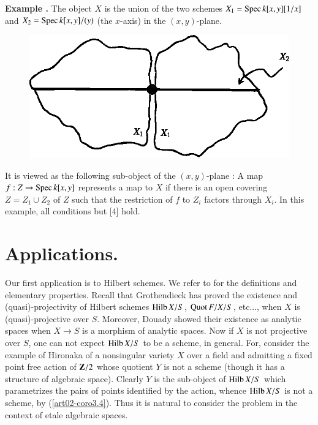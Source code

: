 \medskip
\noindent
{\bf Example .\label{art02-exam5.11}}
The object $X$ is the union of the two schemes $X_{1}=\operatorname{Spec} k[x,y][1/x]$ and $X_{2}=\operatorname{Spec} k[x,y]/(y)$ (the $x$-axis) in the $(x,y)$-plane.
\begin{figure}[H]
\centering
\includegraphics{src/chap2/fig5.eps}
\end{figure}
It is viewed as the following sub-object of the $(x,y)$-plane : A map $f:Z\to \operatorname{Spec} k[x,y]$ represents a map to $X$ if there is an open covering $Z=Z_{1}\cup Z_{2}$ of $Z$ such that the restriction of $f$ to $Z_{i}$ factors through $X_{i}$. In this example, all conditions but [4] hold.

\section{Applications.}\label{art02-sec6}
\pageoriginale

Our first application is to Hilbert schemes. We refer to \cite{art02-key12} for the definitions and elementary properties. Recall that Grothendieck \cite{art02-key12} has proved the existence and (quasi)-projectivity of Hilbert schemes $\operatorname{\mathrm{Hilb}} X/S$, $\operatorname{\mathrm{Quot}} F/X/S$, etc..., when $X$ is (quasi)-projective over $S$. Moreover, Douady \cite{art02-key9} showed their existence as analytic spaces when $X\to S$ is a morphism of analytic spaces. Now if $X$ is not projective over $S$, one can not expect $\operatorname{\mathrm{Hilb}} X/S$ to be a scheme, in general. For, consider the example of Hironaka \cite{art02-key16} of a nonsingular variety $X$ over a field and admitting a fixed point free action of $\mathbf{Z}/2$ whose quotient $Y$ is not a scheme (though it has a structure of algebraic space). Clearly $Y$ is the sub-object of $\operatorname{\mathrm{Hilb}} X/S$ which parametrizes the pairs of points identified by the action, whence $\operatorname{\mathrm{Hilb}} X/S$ is not a scheme, by (\ref{art02-coro3.4}). Thus it is natural to consider the problem in the context of etale algebraic spaces.

